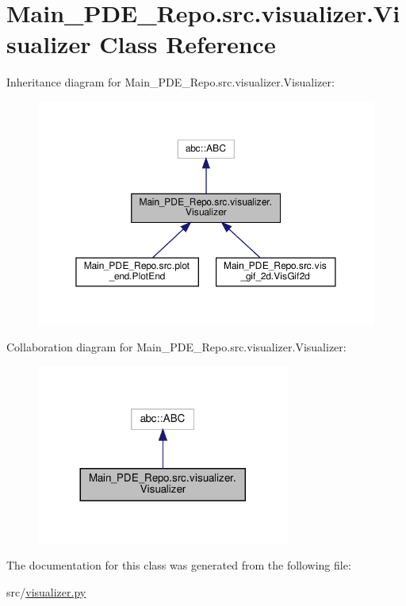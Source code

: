 \hypertarget{classMain__PDE__Repo_1_1src_1_1visualizer_1_1Visualizer}{}\section{Main\+\_\+\+P\+D\+E\+\_\+\+Repo.\+src.\+visualizer.\+Visualizer Class Reference}
\label{classMain__PDE__Repo_1_1src_1_1visualizer_1_1Visualizer}


Inheritance diagram for Main\+\_\+\+P\+D\+E\+\_\+\+Repo.\+src.\+visualizer.\+Visualizer\+:
\nopagebreak
\begin{figure}[H]
\begin{center}
\leavevmode
\includegraphics[width=350pt]{classMain__PDE__Repo_1_1src_1_1visualizer_1_1Visualizer__inherit__graph}
\end{center}
\end{figure}


Collaboration diagram for Main\+\_\+\+P\+D\+E\+\_\+\+Repo.\+src.\+visualizer.\+Visualizer\+:
\nopagebreak
\begin{figure}[H]
\begin{center}
\leavevmode
\includegraphics[width=236pt]{classMain__PDE__Repo_1_1src_1_1visualizer_1_1Visualizer__coll__graph}
\end{center}
\end{figure}


The documentation for this class was generated from the following file\+:\begin{DoxyCompactItemize}
\item 
src/\hyperlink{visualizer_8py}{visualizer.\+py}\end{DoxyCompactItemize}
